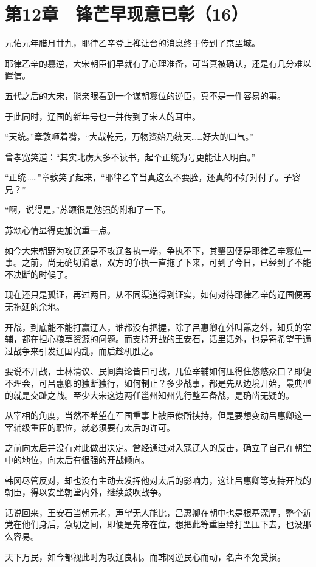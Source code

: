 \section{第12章　锋芒早现意已彰（16）}

元佑元年腊月廿九，耶律乙辛登上禅让台的消息终于传到了京垩城。

耶律乙辛的篡逆，大宋朝臣们早就有了心理准备，可当真被确认，还是有几分难以置信。

五代之后的大宋，能亲眼看到一个谋朝篡位的逆臣，真不是一件容易的事。

于此同时，辽国的新年号也一并传到了宋人的耳中。

“天统。”章敦咂着嘴，“大哉乾元，万物资始乃统天……好大的口气。”

曾孝宽笑道：“其实北虏大多不读书，起个正统为号更能让人明白。”

“正统……”章敦笑了起来，“耶律乙辛当真这么不要脸，还真的不好对付了。子容兄？”

“啊，说得是。”苏颂很是勉强的附和了一下。

苏颂心情显得更加沉重一点。

如今大宋朝野为攻辽还是不攻辽各执一端，争执不下，其肇因便是耶律乙辛篡位一事。之前，尚无确切消息，双方的争执一直拖了下来，可到了今日，已经到了不能不决断的时候了。

现在还只是孤证，再过两日，从不同渠道得到证实，如何对待耶律乙辛的辽国便再无拖延的余地。

开战，到底能不能打赢辽人，谁都没有把握，除了吕惠卿在外叫嚣之外，知兵的宰辅，都在担心粮草资源的问题。而支持开战的王安石，话里话外，也是寄希望于通过战争来引发辽国内乱，而后趁机胜之。

要说不开战，士林清议、民间舆论皆曰可战，几位宰辅如何压得住悠悠众口？即便不理会，可吕惠卿的独断独行，如何制止？多少战事，都是先从边境开始，最典型的就是交趾之战。至少大宋这边两任邕州知州先行整军备战，是确凿无疑的。

从宰相的角度，当然不希望在军国重事上被臣僚所挟持，但是要想变动吕惠卿这一宰辅级重臣的职位，就必须要有太后的许可。

之前向太后并没有对此做出决定。曾经通过对入寇辽人的反击，确立了自己在朝堂中的地位，向太后有很强的开战倾向。

韩冈尽管反对，却也没有主动去发挥他对太后的影响力，这让吕惠卿等支持开战的朝臣，得以安坐朝堂内外，继续鼓吹战争。

话说回来，王安石当朝元老，声望无人能比，吕惠卿在朝中也是根基深厚，整个新党在他们身后，急切之间，即便是先帝在位，想把此等重臣给打垩压下去，也没那么容易。

天下万民，如今都视此时为攻辽良机。而韩冈逆民心而动，名声不免受损。

